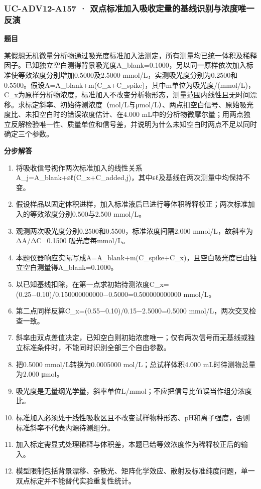 \documentclass[UTF8,11pt,a4paper]{ctexart}
\begin{document}
\subsubsection*{UC-ADV12-A157 · 双点标准加入吸收定量的基线识别与浓度唯一反演}
\noindent\textbf{题目}\par
某假想无机微量分析物通过吸光度标准加入法测定，所有测量均已统一体积及稀释因子。已知独立空白测得背景吸光度A\_blank=0.1000，另以同一原样依次加入标准使等效浓度分别增加0.5000及2.5000 mmol/L，实测吸光度分别为0.2500和0.5500。假设A=A\_blank+m(C\_x+C\_spike)，其中m单位为吸光度/(mmol/L)，C\_x为原样分析物浓度，标准加入不改变分析物形态，测量范围内线性且无时间漂移。求标定斜率、初始待测浓度（mol/L与μmol/L）、两点扣空白信号、原始吸光度比、未扣空白时的错误浓度估计、在4.000 mL中的分析物微摩尔量；用两点独立反解检验唯一性、质量单位和信号差，并说明为什么未知空白时两点不足以同时确定三个参数。\par
\medskip\noindent\textbf{分步解答}
\begin{enumerate}
\item 将吸收信号视作两次标准加入的线性关系A\_j=A\_blank+εℓ(C\_x+C\_added,j)，其中εℓ及基线在两次测量中均保持不变。
\item 假设样品以固定体积进样，加入标准液后已进行等体积稀释校正；两次标准加入的等效浓度分别0.500与2.500 mmol/L。
\item 观测两次吸光度分别0.2500和0.5500，标准浓度间隔2.000 mmol/L，故斜率为ΔA/ΔC=0.1500 吸光度每mmol/L。
\item 本题仪器响应实际写成A=A\_blank+m(C\_spike+C\_x)，且空白吸光度已由独立空白测量得A\_blank=0.1000。
\item 以已知基线扣除，在第一点求初始待测浓度C\_x=(0.25−0.10)/0.150000000000−0.5000=0.500000000000 mmol/L。
\item 第二点同样反算C\_x=(0.55−0.10)/0.15−2.5000=0.5000 mmol/L，两次交叉检查一致。
\item 斜率由双点差值决定，已知空白则初始浓度唯一；仅有两次信号而无基线或独立标准条件时，不能同时识别全部三个自由参数。
\item 把0.5000 mmol/L转换为0.0005000 mol/L；总试样体积4.000 mL时待测物总量为2.000 μmol。
\item 吸光度是无量纲光学量，斜率单位L/mmol；不应把信号比值误当作组分浓度比。
\item 标准加入必须处于线性吸收区且不改变试样物种形态、pH和离子强度，否则标准斜率不代表内源待测组分。
\item 加入标定需显式处理稀释与体积差，本题已给等效浓度作为稀释校正后的输入。
\item 模型限制包括背景漂移、杂散光、矩阵化学效应、散射及标准纯度问题，单一双点标定并不能替代实验重复性统计。
\end{enumerate}
\end{document}
